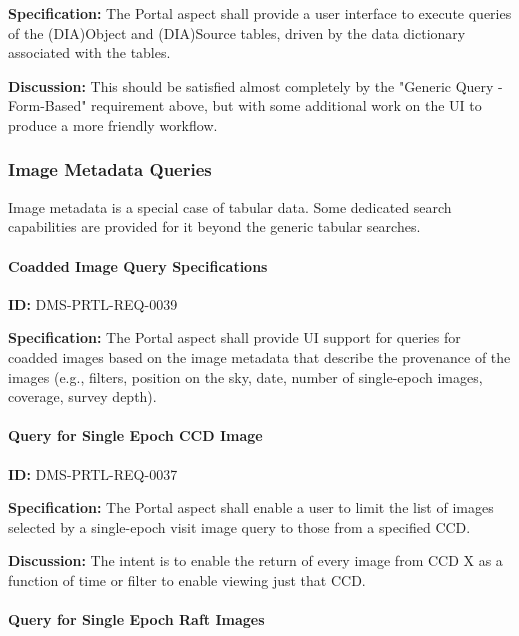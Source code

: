 \documentclass[SE,toc,lsstdraft]{lsstdoc}
\begin{document}
\textbf{Specification:}
The Portal aspect shall provide a user interface to execute queries of the (DIA)Object and (DIA)Source tables, driven by the data dictionary associated with the tables.

\textbf{Discussion:}
This should be satisfied almost completely by the "Generic Query - Form-Based" requirement above, but with some additional work on the UI to produce a more friendly workflow.

\subsubsection{Image Metadata Queries}

Image metadata is a special case of tabular data.  Some dedicated search capabilities are provided for it beyond the generic tabular searches.

\paragraph{Coadded Image Query Specifications}\hfill  %

\label{DMS-PRTL-REQ-0039}
\textbf{ID:} DMS-PRTL-REQ-0039

\textbf{Specification:}
The Portal aspect shall provide UI support for queries for coadded images based on the image metadata that describe the provenance of the images (e.g., filters, position on the sky, date, number of single-epoch images, coverage, survey depth).

\paragraph{Query for Single Epoch CCD Image}\hfill  %

\label{DMS-PRTL-REQ-0037}
\textbf{ID:} DMS-PRTL-REQ-0037

\textbf{Specification:}
The Portal aspect shall enable a user to limit the list of images selected by a single-epoch visit image query to those from a specified CCD.

\textbf{Discussion:}
The intent is to enable the return of every image from CCD X as a function of time or filter to enable viewing just that CCD.

\paragraph{Query for Single Epoch Raft Images}\hfill  %
\end{document}
